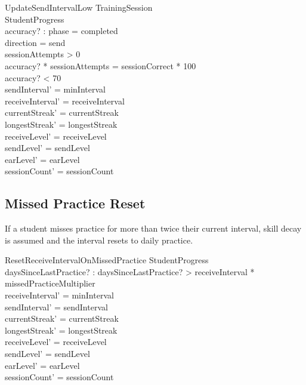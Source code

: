 \documentclass[a4paper,10pt,fleqn]{article}
\begin{document}
\begin{schema}{UpdateSendIntervalLow}
\Xi TrainingSession \\
\Delta StudentProgress \\
accuracy? : \nat
\where
phase = completed \\
direction = send \\
sessionAttempts > 0 \\
accuracy? * sessionAttempts = sessionCorrect * 100 \\
accuracy? < 70 \\
sendInterval' = minInterval \\
receiveInterval' = receiveInterval \\
currentStreak' = currentStreak \\
longestStreak' = longestStreak \\
receiveLevel' = receiveLevel \\
sendLevel' = sendLevel \\
earLevel' = earLevel \\
sessionCount' = sessionCount
\end{schema}

\subsection{Missed Practice Reset}

If a student misses practice for more than twice their current interval,
skill decay is assumed and the interval resets to daily practice.

\begin{schema}{ResetReceiveIntervalOnMissedPractice}
\Delta StudentProgress \\
daysSinceLastPractice? : \nat
\where
daysSinceLastPractice? > receiveInterval * missedPracticeMultiplier \\
receiveInterval' = minInterval \\
sendInterval' = sendInterval \\
currentStreak' = currentStreak \\
longestStreak' = longestStreak \\
receiveLevel' = receiveLevel \\
sendLevel' = sendLevel \\
earLevel' = earLevel \\
sessionCount' = sessionCount
\end{schema}
\end{document}
